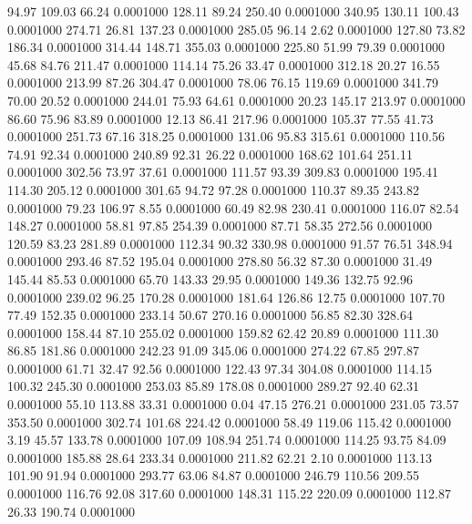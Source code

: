   94.97  109.03   66.24   0.0001000
 128.11   89.24  250.40   0.0001000
 340.95  130.11  100.43   0.0001000
 274.71   26.81  137.23   0.0001000
 285.05   96.14    2.62   0.0001000
 127.80   73.82  186.34   0.0001000
 314.44  148.71  355.03   0.0001000
 225.80   51.99   79.39   0.0001000
  45.68   84.76  211.47   0.0001000
 114.14   75.26   33.47   0.0001000
 312.18   20.27   16.55   0.0001000
 213.99   87.26  304.47   0.0001000
  78.06   76.15  119.69   0.0001000
 341.79   70.00   20.52   0.0001000
 244.01   75.93   64.61   0.0001000
  20.23  145.17  213.97   0.0001000
  86.60   75.96   83.89   0.0001000
  12.13   86.41  217.96   0.0001000
 105.37   77.55   41.73   0.0001000
 251.73   67.16  318.25   0.0001000
 131.06   95.83  315.61   0.0001000
 110.56   74.91   92.34   0.0001000
 240.89   92.31   26.22   0.0001000
 168.62  101.64  251.11   0.0001000
 302.56   73.97   37.61   0.0001000
 111.57   93.39  309.83   0.0001000
 195.41  114.30  205.12   0.0001000
 301.65   94.72   97.28   0.0001000
 110.37   89.35  243.82   0.0001000
  79.23  106.97    8.55   0.0001000
  60.49   82.98  230.41   0.0001000
 116.07   82.54  148.27   0.0001000
  58.81   97.85  254.39   0.0001000
  87.71   58.35  272.56   0.0001000
 120.59   83.23  281.89   0.0001000
 112.34   90.32  330.98   0.0001000
  91.57   76.51  348.94   0.0001000
 293.46   87.52  195.04   0.0001000
 278.80   56.32   87.30   0.0001000
  31.49  145.44   85.53   0.0001000
  65.70  143.33   29.95   0.0001000
 149.36  132.75   92.96   0.0001000
 239.02   96.25  170.28   0.0001000
 181.64  126.86   12.75   0.0001000
 107.70   77.49  152.35   0.0001000
 233.14   50.67  270.16   0.0001000
  56.85   82.30  328.64   0.0001000
 158.44   87.10  255.02   0.0001000
 159.82   62.42   20.89   0.0001000
 111.30   86.85  181.86   0.0001000
 242.23   91.09  345.06   0.0001000
 274.22   67.85  297.87   0.0001000
  61.71   32.47   92.56   0.0001000
 122.43   97.34  304.08   0.0001000
 114.15  100.32  245.30   0.0001000
 253.03   85.89  178.08   0.0001000
 289.27   92.40   62.31   0.0001000
  55.10  113.88   33.31   0.0001000
   0.04   47.15  276.21   0.0001000
 231.05   73.57  353.50   0.0001000
 302.74  101.68  224.42   0.0001000
  58.49  119.06  115.42   0.0001000
   3.19   45.57  133.78   0.0001000
 107.09  108.94  251.74   0.0001000
 114.25   93.75   84.09   0.0001000
 185.88   28.64  233.34   0.0001000
 211.82   62.21    2.10   0.0001000
 113.13  101.90   91.94   0.0001000
 293.77   63.06   84.87   0.0001000
 246.79  110.56  209.55   0.0001000
 116.76   92.08  317.60   0.0001000
 148.31  115.22  220.09   0.0001000
 112.87   26.33  190.74   0.0001000
